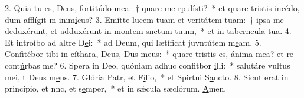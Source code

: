 2. Quia tu es, Deus, fortitúdo mea:~† quare me rpul\uline{í}sti?~* et quare tristis incédo, dum afflígit m inim\uline{í}cus?
3. Emítte lucem tuam et veritátem tuam:~† ipsa me deduxérunt, et adduxérunt in montem snctum t\uline{u}um,~* et in taberncula t\uline{u}a.
4. Et introíbo ad altre D\uline{e}i:~* ad Deum, qui lætíficat juvntútem m\uline{e}am.
5. Confitébor tibi in cíthara, Deus, Dus m\uline{e}us:~* quare tristis es, ánima mea? et re cont\uline{ú}rbas me?
6. Spera in Deo, quóniam adhuc confitbor \uline{i}lli:~* salutáre vultus mei, t Deus m\uline{e}us.
7. Glória Patr, et F\uline{í}lio,~* et Spirtui S\uline{a}ncto.
8. Sicut erat in princípio, et nnc, et s\uline{e}mper,~* et in sǽcula sæclórum. \uline{A}men.
